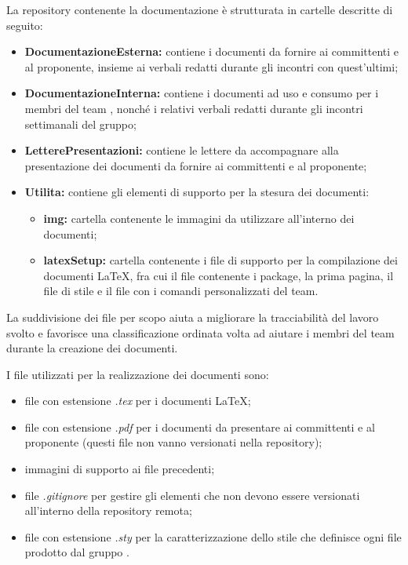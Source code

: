 La repository contenente la documentazione è strutturata in cartelle descritte di seguito:
\begin{itemize}
 \item \textbf{DocumentazioneEsterna:} contiene i documenti da fornire ai committenti e al proponente, insieme ai verbali redatti durante gli incontri con quest'ultimi;
\item \textbf{DocumentazioneInterna:} contiene i documenti ad uso e consumo per i membri del team \Omicron, nonché i relativi verbali redatti durante gli incontri settimanali del gruppo;
\item \textbf{LetterePresentazioni:} contiene le lettere da accompagnare alla presentazione dei documenti da fornire ai committenti e al proponente;
\item \textbf{Utilita:} contiene gli elementi di supporto per la stesura dei documenti:
\begin{itemize}
	\item \textbf{img:} cartella contenente le immagini da utilizzare all'interno dei documenti;
	\item \textbf{latexSetup: } cartella contenente i file di supporto per la compilazione dei documenti \LaTeX, fra cui il file contenente i package, la prima pagina, il file di stile e il file con i comandi personalizzati del team.
\end{itemize}
\end{itemize}
La suddivisione dei file per scopo aiuta a migliorare la tracciabilità del lavoro svolto e favorisce una classificazione ordinata volta ad aiutare i membri del team durante la creazione dei documenti.


I file utilizzati per la realizzazione dei documenti sono:
\begin{itemize}
	\item file con estensione \textit{.tex} per i documenti \LaTeX;
	\item file con estensione \textit{.pdf} per i documenti da presentare ai committenti e al proponente (questi file non vanno versionati nella repository);
	\item immagini di supporto ai file precedenti;
	\item file \textit{.gitignore} per gestire gli elementi che non devono essere versionati all'interno della repository remota;
	\item file con estensione \textit{.sty} per la caratterizzazione dello stile che definisce ogni file prodotto dal gruppo \Omicron.
\end{itemize}


